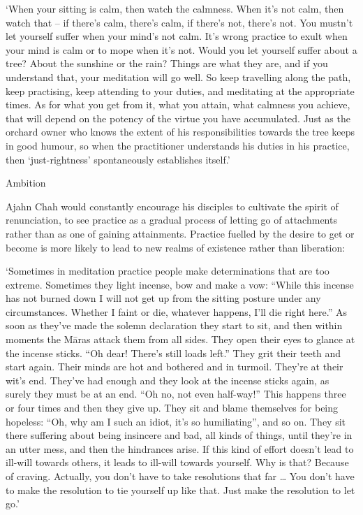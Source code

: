 `When your sitting is calm, then watch the calmness. When it's not calm,
then watch that -- if there's calm, there's calm, if there's not,
there's not. You mustn't let yourself suffer when your mind's not calm.
It's wrong practice to exult when your mind is calm or to mope when it's
not. Would you let yourself suffer about a tree? About the sunshine or
the rain? Things are what they are, and if you understand that, your
meditation will go well. So keep travelling along the path, keep
practising, keep attending to your duties, and meditating at the
appropriate times. As for what you get from it, what you attain, what
calmness you achieve, that will depend on the potency of the virtue you
have accumulated. Just as the orchard owner who knows the extent of his
responsibilities towards the tree keeps in good humour, so when the
practitioner understands his duties in his practice, then
`just-rightness' spontaneously establishes itself.'

Ambition

Ajahn Chah would constantly encourage his disciples to cultivate the
spirit of renunciation, to see practice as a gradual process of letting
go of attachments rather than as one of gaining attainments. Practice
fuelled by the desire to get or become is more likely to lead to new
realms of existence rather than liberation:

`Sometimes in meditation practice people make determinations that are
too extreme. Sometimes they light incense, bow and make a vow: ``While
this incense has not burned down I will not get up from the sitting
posture under any circumstances. Whether I faint or die, whatever
happens, I'll die right here.'' As soon as they've made the solemn
declaration they start to sit, and then within moments the Māras attack
them from all sides. They open their eyes to glance at the incense
sticks. ``Oh dear! There's still loads left.'' They grit their teeth and
start again. Their minds are hot and bothered and in turmoil. They're at
their wit's end. They've had enough and they look at the incense sticks
again, as surely they must be at an end. ``Oh no, not even half-way!''
This happens three or four times and then they give up. They sit and
blame themselves for being hopeless: ``Oh, why am I such an idiot, it's
so humiliating'', and so on. They sit there suffering about being
insincere and bad, all kinds of things, until they're in an utter mess,
and then the hindrances arise. If this kind of effort doesn't lead to
ill-will towards others, it leads to ill-will towards yourself. Why is
that? Because of craving. Actually, you don't have to take resolutions
that far \ldots{} You don't have to make the resolution to tie yourself
up like that. Just make the resolution to let go.'

